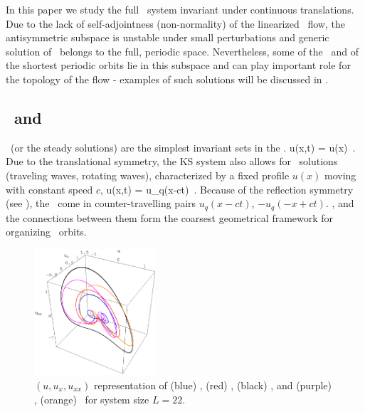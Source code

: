 In this paper we study the full \KS\ system invariant
under continuous translations. Due to the lack of self-adjointness
(non-normality) of the linearized \KS\ flow,
the antisymmetric subspace
is unstable under small perturbations and generic solution of
\KSe\ belongs to the full, periodic space. Nevertheless, some of
the \eqva\ and of the shortest periodic orbits lie in this subspace
and can play important role for the topology of the flow - examples
of such solutions will be discussed in .

\subsection{\Eqva\ and \reqva} %
\label{sec:stks}


\Eqva\  (or the steady solutions)
are the simplest invariant sets in
the \statesp. 
\beq
 u(x,t) = u(x) %
\,.
Due to the translational symmetry,
the KS system also allows for \reqv\ solutions
(traveling waves, rotating waves),
characterized by a fixed profile $u(x)$
moving with constant speed $c$, {\ie}
\beq
 u(x,t) =  u_q(x-ct) %
\,.
Because of the reflection symmetry (see ),
the \reqva\ come in counter-travelling pairs
$u_q(x-ct)$, $-u_q(-x+ct)$. %
\Eqva,  and
the connections between them form the
coarsest geometrical framework for organizing
\statesp\ orbits. %


\begin{figure}[t] \label{f:eqvSpatial}
\begin{center}
\includegraphics[width=0.4\textwidth]{figs/equilSpatial.eps}
\end{center}
\caption{
$(u,u_x,u_{xx})$ representation
of (blue) , (red) ,  (black)  \eqva,
 and (purple) , (orange)  \reqva\ for
system size $L=22$. 
        }
\end{figure}


